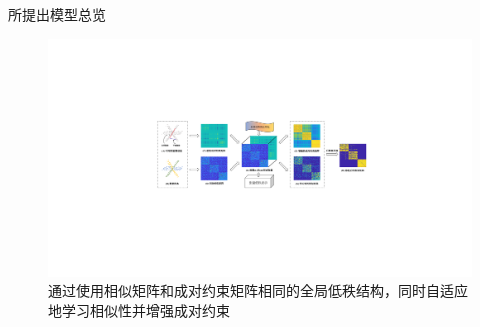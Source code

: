 \documentclass{beamer}
\begin{document}
\begin{frame}{所提出模型总览}
    \begin{figure}[htpb]
        \centering
        \includegraphics[width=1\linewidth]{pic/1.pdf}
        \caption{通过使用相似矩阵和成对约束矩阵相同的全局低秩结构，同时自适应地学习相似性并增强成对约束}
    \end{figure}

        
\end{frame}





        
\end{document}
